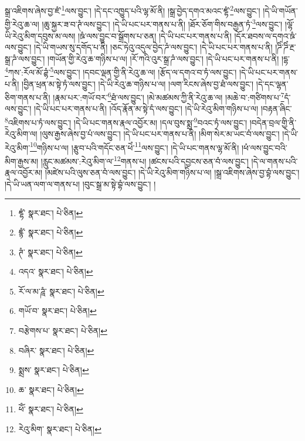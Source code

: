 སྒྲ་འཇིགས་ཞེས་བྱ་ཛཾ་\footnote{ཛྷཾ་  སྣར་ཐང་།  པེ་ཅིན། }ལས་བྱུང་། །དེ་དང་འཁྱུད་པའི་ལྷ་མོ་ནི། །སྒྲ་བྱེད་དགའ་མའང་ཛྷཾ་\footnote{ཛྙཾ་  སྣར་ཐང་།  པེ་ཅིན། }ལས་བྱུང་། །དེ་ཡི་གཡོན་གྱི་རེའུ་ཆ་ལ། །ཆུ་སྐྱར་ཟ་བ་ཊཾ་ལས་བྱུང་། །དེ་ཡི་པང་པར་གནས་པ་ནི། །ཐོར་ཅོག་གིས་བརྒྱན་ཏཾ་\footnote{ཊཾ་  སྣར་ཐང་།  པེ་ཅིན། }ལས་བྱུང་། །ལྷོ་ཡི་རེའུ་མིག་དབུས་མ་ལས། །ཋཾ་ལས་བྱུང་བ་སྒྲོགས་པ་ཅན། །དེ་ཡི་པང་པར་གནས་པ་ནི། །དོར་ཐབས་ལ་དགའ་ཋཾ་ལས་བྱུང་། །དེ་ཡི་གཡས་སུ་དགོད་པ་ནི། །ཅང་ཏེའུ་འདུལ་བྱེད་ཌཾ་ལས་བྱུང་། །དེ་ཡི་པང་པར་གནས་པ་ནི། །ཌིཾ་ཌིཾ་རྔ་སྒྲ་ཌཾ་ལས་བྱུང་། །གཡོན་གྱི་རེའུ་ཆ་གཉིས་པ་ལ། །རོ་ཀའི་འུར་སྒྲ་ཌཾ་ལས་བྱུང་། །དེ་ཡི་པང་པར་གནས་པ་ནི། །དྷ་\footnote{འདའ་  སྣར་ཐང་།  པེ་ཅིན། }ཀས་:རོལ་མོ་ཌྷཾ་\footnote{རོ་ལ་མ་ཌཱཾ་  སྣར་ཐང་།  པེ་ཅིན། }ལས་བྱུང་། །དབང་ལྡན་གྱི་ནི་རེའུ་ཆ་ལ། །རྩོད་ལ་དགའ་བ་ཏཾ་ལས་བྱུང་། །དེ་ཡི་པང་པར་གནས་པ་ནི། །བྱིན་ཕྲན་མ་སྟེ་ཏཾ་ལས་བྱུང་། །དེ་ཡི་རེའུ་ཆ་གཉིས་པ་ལ། །ལག་རིངས་ཞེས་བྱ་ཐཾ་ལས་བྱུང་། །དེ་དང་ལྷན་ཅིག་གནས་པ་ནི། །རྣམ་པར་:གཡོ་བར་\footnote{གཡོ་བ་  སྣར་ཐང་།  པེ་ཅིན། }ཐཾ་ལས་བྱུང་། །མེ་མཚམས་ཀྱི་ནི་རེའུ་ཆ་ལ། །མཆེ་བ་:གཙིགས་པ་\footnote{བརྩེགས་པ་  སྣར་ཐང་།  པེ་ཅིན། }དཾ་ལས་བྱུང་། །དེ་ཡི་པང་པར་གནས་པ་ནི། །འོད་རྣོན་མ་སྟེ་དཾ་ལས་བྱུང་། །དེ་ཡི་རེའུ་མིག་གཉིས་པ་ལ། །བརྟན་ཞིང་\footnote{བཞིར་  སྣར་ཐང་།  པེ་ཅིན། }འཇིགས་པ་ཏཾ་ལས་བྱུང་། །དེ་ཡི་པང་གནས་རྣལ་འབྱོར་མ། །དལ་བུས་སྨྲ་\footnote{སྨྲས་  སྣར་ཐང་།  པེ་ཅིན། }བའང་ཏཾ་ལས་བྱུང་། །བདེན་བྲལ་གྱི་ནི་རེའུ་མིག་ལ། །ལུས་རྒྱས་ཞེས་བྱ་པཾ་ལས་བྱུང་། །དེ་ཡི་པང་པར་གནས་པ་ནི། །མིག་སེར་མ་ཡང་བཾ་ལས་བྱུང་། །དེ་ཡི་རེའུ་མིག་\footnote{ཆ་  སྣར་ཐང་།  པེ་ཅིན། }གཉིས་པ་ལ། །རྩུབ་པའི་གདོང་ཅན་ཕེཾ་\footnote{ཕོཾ་  སྣར་ཐང་།  པེ་ཅིན། }ལས་བྱུང་། །དེ་ཡི་པང་གནས་ལྷ་མོ་ནི། །ཕཾ་ལས་བྱུང་བའི་མིག་རྒྱས་མ། །རླུང་མཚམས་:རེའུ་མིག་ལ་\footnote{རེའུ་མིག་  སྣར་ཐང་།  པེ་ཅིན། }གནས་པ། །ཚངས་པའི་དབྱངས་ཅན་བཾ་ལས་བྱུང་། །དེ་ལ་གནས་པའི་རྣལ་འབྱོར་མ། །མཛེས་པའི་ལུས་ཅན་བཾ་ལས་བྱུང་། །དེ་ཡི་རེའུ་མིག་གཉིས་པ་ལ། །སྒྲ་འཇིགས་ཞེས་བྱ་བྷཾ་ལས་བྱུང་། །དེ་ཡི་ཡན་ལག་ལ་གནས་པ། །བུང་སྒྲ་མ་སྟེ་བྷཾ་ལས་བྱུང་། །
